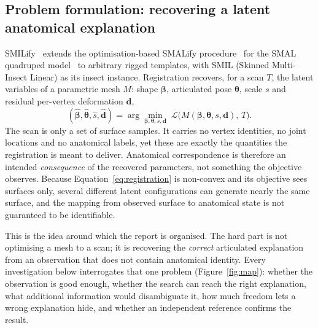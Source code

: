 \subsection{Problem formulation: recovering a latent anatomical explanation}
\label{sec:problem}

SMILify~\cite{smilify} extends the optimisation-based SMALify
procedure~\cite{smalify} for the SMAL quadruped model~\cite{smal} to arbitrary
rigged templates, with SMIL (Skinned Multi-Insect Linear) as its insect
instance. Registration recovers, for a scan $T$, the latent variables of a
parametric mesh $M$: shape $\bm\beta$, articulated pose $\bm\theta$, scale $s$
and residual per-vertex deformation $\mathbf d$,
\begin{equation}
(\hat{\bm\beta},\hat{\bm\theta},\hat s,\hat{\mathbf d})
 =\arg\min_{\bm\beta,\bm\theta,s,\mathbf d}\;
 \mathcal{L}\big(M(\bm\beta,\bm\theta,s,\mathbf d),\,T\big).
\label{eq:registration}
\end{equation}
The scan is only a set of surface samples. It carries no vertex identities, no
joint locations and no anatomical labels, yet these are exactly the quantities
the registration is meant to deliver. Anatomical correspondence is therefore an
intended \emph{consequence} of the recovered parameters, not something the
objective observes. Because Equation~\eqref{eq:registration} is non-convex and
its objective sees surfaces only, several different latent configurations can
generate nearly the same surface, and the mapping from observed surface to
anatomical state is not guaranteed to be identifiable.

This is the idea around which the report is organised. The hard part is not
optimising a mesh to a scan; it is recovering the \emph{correct} articulated
explanation from an observation that does not contain anatomical identity.
Every investigation below interrogates that one problem
(Figure~\ref{fig:map}): whether the observation is good enough, whether the
search can reach the right explanation, what additional information would
disambiguate it, how much freedom lets a wrong explanation hide, and whether an
independent reference confirms the result.

